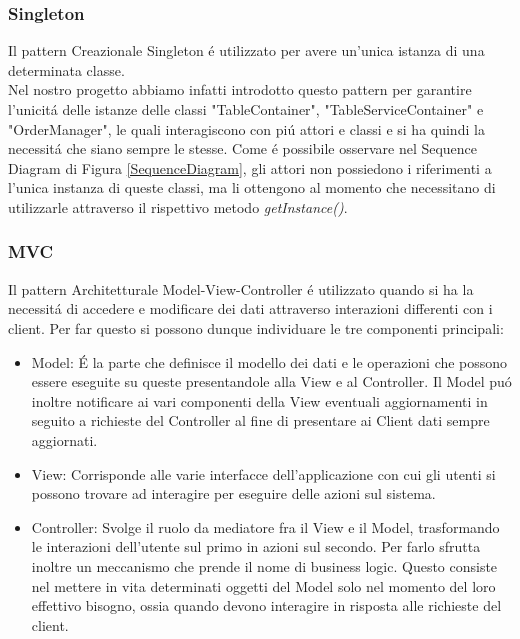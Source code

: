 \documentclass{article}
\begin{document}
\newpage

\subsubsection{Singleton}

Il pattern Creazionale Singleton \'e utilizzato per avere un'unica istanza di una determinata classe. \\
Nel nostro progetto abbiamo infatti introdotto questo pattern per garantire l'unicit\'a delle istanze delle classi "TableContainer", "TableServiceContainer" e "OrderManager", le quali interagiscono con pi\'u attori e classi e si ha quindi la necessit\'a che siano sempre le stesse. Come \'e possibile osservare nel Sequence Diagram di Figura \ref{SequenceDiagram}, gli attori non possiedono i riferimenti a l'unica instanza di queste classi, ma li ottengono al momento che necessitano di utilizzarle attraverso il rispettivo metodo \textit{getInstance()}.

\subsubsection{MVC}

Il pattern Architetturale Model-View-Controller \'e utilizzato quando si ha la necessit\'a di accedere e modificare dei dati attraverso interazioni differenti con i client. Per far questo si possono dunque individuare le tre componenti principali:

\begin{itemize}
\item Model: \'E la parte che definisce il modello dei dati e le operazioni che possono essere  eseguite su queste presentandole alla View e al Controller. Il Model pu\'o inoltre notificare ai vari componenti della View eventuali aggiornamenti in seguito a richieste del Controller al fine di presentare ai Client dati sempre aggiornati.

\item View: Corrisponde alle varie interfacce dell'applicazione con cui gli utenti si possono trovare ad interagire per eseguire delle azioni sul sistema.
 
\item Controller: Svolge il ruolo da mediatore fra il View e il Model, trasformando le interazioni dell'utente sul primo in azioni sul secondo. Per farlo sfrutta inoltre un meccanismo che prende il nome di business logic. Questo consiste nel mettere in vita determinati oggetti del Model solo nel momento del loro effettivo bisogno, ossia quando devono interagire in risposta alle richieste del client.
\end{itemize}
\end{document}
